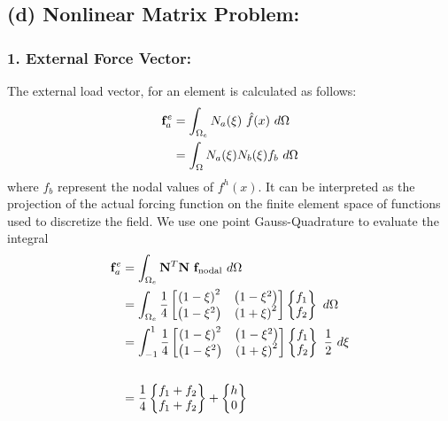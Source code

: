 \documentclass[11pt]{article}
\begin{document}
\subsection*{(d) Nonlinear Matrix Problem: }
\subsubsection*{1. External Force Vector:}
The external load vector, for an element is calculated as follows:
\begin{align}
\begin{split}
{\bf f}^e_a  & = \int_{\Omega_e} N_a(\xi)\ \hat{f}(x)\ d\Omega \\
& = \int_{\Omega} N_a (\xi) N_b(\xi) f_b\ d\Omega
\end{split}
\end{align}
where $f_b$ represent the nodal values of $f^h (x) $. It can be interpreted as the projection of the actual forcing function on the finite element space of functions used to discretize the field. We use one point Gauss-Quadrature to evaluate the integral
\begin{align*}
\begin{split}
{\bf f}^e_a 
& =
\int_{\Omega_e} {\bf N}^T {\bf N}\ {\bf f}_{\rm nodal} \ d\Omega \\
& = \int_{\Omega_e} \frac{1}{4}
\begin{bmatrix}
\left( 1- \xi \right)^2 & \left( 1- \xi ^2 \right) \\
\left( 1- \xi^2 \right) & \left( 1+ \xi \right)^2 \\
\end{bmatrix} 
\begin{Bmatrix}
f_1 \\
f_2
\end{Bmatrix}\ d\Omega \\
& = \int_{-1}^{1} \frac{1}{4}
\begin{bmatrix}
\left( 1- \xi \right)^2 & \left( 1- \xi ^2 \right) \\
\left( 1- \xi^2 \right) & \left( 1+ \xi \right)^2 \\
\end{bmatrix} 
\begin{Bmatrix}
f_1 \\
f_2
\end{Bmatrix}\ \frac{1}{2}\ d\xi \\ \\
& = \frac{1}{4}
\begin{Bmatrix}
f_1 + f_2 \\
f_1 + f_2
\end{Bmatrix} + 
\begin{Bmatrix}
h\\0
\end{Bmatrix}
\end{split}
\end{align*}
\end{document}
